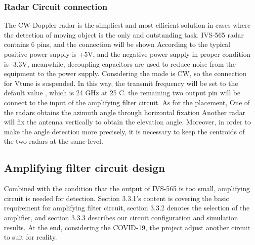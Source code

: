 \subsubsection{Radar Circuit connection}
The CW-Doppler radar is the simpliest and most efficient solution in cases where the detection of moving object is the only and outstanding task. 
IVS-565 radar contains 6 pins, and the connection will be shown According to  \textcite{IVS-565}
the typical positive power supply is +5V, and the negative power supply in proper condition is -3.3V, meanwhile, decoupling capacitors are used to reduce noise from the equipment to the power supply. Considering the mode is CW, so the connection for Vtune is suspended. In this way, the transmit frequency will be set to the default value , which is 24 GHz at 25 C.
the remaining two output pin will be connect to the input of the amplifying filter circuit.
As for the placement, One of the radars obtains the azimuth angle through horizontal fixation
Another radar will fix the antenna vertically to obtain the elevation angle. Moreover, in order to make the angle detection more precisely, it is necessary to keep the centroids of the two radars at the same level. 
\subsection{Amplifying filter circuit design}
Combined with the condition that the output of IVS-565 is too small, amplifying circuit is needed for detection. Section 3.3.1’s content is covering the basic requirement for amplifying filter circuit, section 3.3.2 denotes the selection of the amplifier, and section 3.3.3 describes our circuit configuration and simulation results. At the end, considering the COVID-19, the project adjust another circuit to suit for reality.
